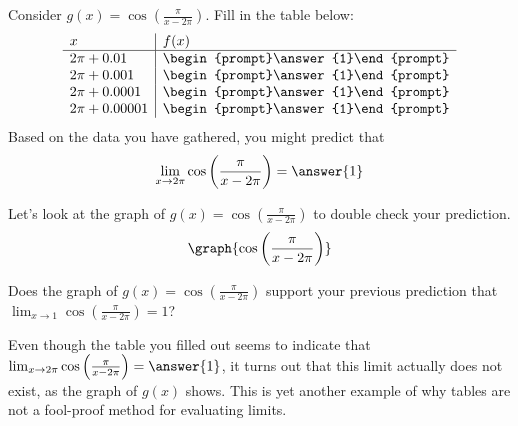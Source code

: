 \documentclass[handout]{ximera}
\begin{document}
\begin{exercise}
Consider $g(x) = \cos\left(\frac{\pi}{x-2\pi}\right)$. Fill in the 
  table below:
  \[
  \begin{array}{l|l}
    x      & f(x)      \\ \hline
    2\pi + 0.01    & \begin{prompt}\answer{1}\end{prompt}\\
    2\pi + 0.001   & \begin{prompt}\answer{1}\end{prompt}\\
    2\pi + 0.0001  & \begin{prompt}\answer{1}\end{prompt}\\
    2\pi + 0.00001 & \begin{prompt}\answer{1}\end{prompt}
  \end{array}
  \]
  Based on the data you have gathered, you might predict that 
  \[
  \lim_{x\to 2\pi}  \cos\left(\frac{\pi}{x-2\pi}\right)= \answer{1}
  \]
  
    \begin{exercise}
Let's look at the graph of $g(x) = \cos\left(\frac{\pi}{x-2\pi}\right)$ to double check your prediction. 
\[
\graph{\cos\left(\frac{\pi}{x-2\pi}\right)}
\]

Does the graph of $g(x) = \cos\left(\frac{\pi}{x-2\pi}\right)$ support your previous prediction that $\lim_{x\to 1} \cos\left(\frac{\pi}{x-2\pi}\right) = 1$? 

\begin{multipleChoice}
    
\begin{feedback}[correct]

Even though the table you filled out seems to indicate that $\lim_{x\to 2\pi}  \cos\left(\frac{\pi}{x-2\pi}\right)= \answer{1}$, it turns out that this limit actually does not exist, as the graph of $g(x)$ shows.  This is yet another example of why tables are not a fool-proof method for evaluating limits.  

\end{feedback}
\end{multipleChoice}
    \end{exercise}

\end{exercise}
\end{document}

